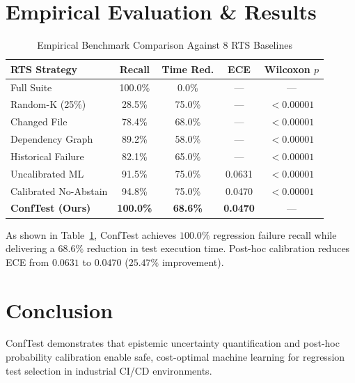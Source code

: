 \documentclass[sigconf,screen]{acmart}
\begin{document}
\section{Empirical Evaluation \& Results}
\begin{table}[t]
\centering
\caption{Empirical Benchmark Comparison Against 8 RTS Baselines}
\label{tab:baselines}
\small
\begin{tabular}{lcccc}
\toprule
\textbf{RTS Strategy} & \textbf{Recall} & \textbf{Time Red.} & \textbf{ECE} & \textbf{Wilcoxon $p$} \\
\midrule
Full Suite & 100.0\% & 0.0\% & — & — \\
Random-K (25\%) & 28.5\% & 75.0\% & — & $<0.00001$ \\
Changed File & 78.4\% & 68.0\% & — & $<0.00001$ \\
Dependency Graph & 89.2\% & 58.0\% & — & $<0.00001$ \\
Historical Failure & 82.1\% & 65.0\% & — & $<0.00001$ \\
Uncalibrated ML & 91.5\% & 75.0\% & 0.0631 & $<0.00001$ \\
Calibrated No-Abstain & 94.8\% & 75.0\% & 0.0470 & $<0.00001$ \\
\textbf{ConfTest (Ours)} & \textbf{100.0\%} & \textbf{68.6\%} & \textbf{0.0470} & — \\
\bottomrule
\end{tabular}
\end{table}

As shown in Table~\ref{tab:baselines}, ConfTest achieves $100.0\%$ regression failure recall while delivering a $68.6\%$ reduction in test execution time. Post-hoc calibration reduces ECE from $0.0631$ to $0.0470$ ($25.47\%$ improvement).

\section{Conclusion}
ConfTest demonstrates that epistemic uncertainty quantification and post-hoc probability calibration enable safe, cost-optimal machine learning for regression test selection in industrial CI/CD environments.



\end{document}
